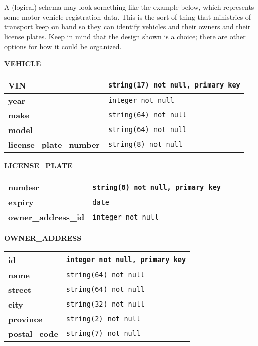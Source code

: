 A (logical) schema may look something like the example below, which represents some motor vehicle registration data. This is the sort of thing that ministries of transport keep on hand so they can identify vehicles and their owners and their license plates. Keep in mind that the design shown is a choice; there are other options for how it could be organized.
\vspace{1em}
\begin{center}
	\textbf{VEHICLE}\\
	\begin{tabular}{|l|l|}\hline
		\textbf{VIN} & \texttt{string(17) not null, primary key}\\ \hline		
		\textbf{year} & \texttt{integer not null}\\ \hline
		\textbf{make} & \texttt{string(64) not null}\\ \hline
		\textbf{model} & \texttt{string(64) not null}\\ \hline		
		\textbf{license\_plate\_number} & \texttt{string(8) not null}\\ \hline		
	\end{tabular}
	
	\textbf{LICENSE\_PLATE}\\
	\begin{tabular}{|l|l|}\hline
		\textbf{number} & \texttt{string(8) not null, primary key}\\ \hline
		\textbf{expiry} & \texttt{date} \\ \hline
		\textbf{owner\_address\_id} & \texttt{integer not null}\\ \hline		
	\end{tabular}
	
		\textbf{OWNER\_ADDRESS}\\
	\begin{tabular}{|l|l|}\hline
		\textbf{id} & \texttt{integer not null,  primary key}\\ \hline
		\textbf{name} & \texttt{string(64) not null}\\ \hline
		\textbf{street} & \texttt{string(64) not null}\\ \hline
		\textbf{city} & \texttt{string(32) not null}\\ \hline
		\textbf{province} & \texttt{string(2) not null}\\ \hline
		\textbf{postal\_code} & \texttt{string(7) not null}\\ \hline

	\end{tabular}
\end{center}

